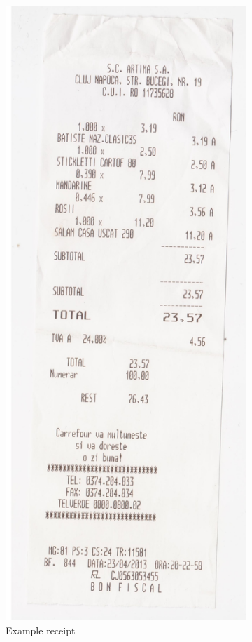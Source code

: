 \begin{figure}
\centering
\begin{subfigure}{0.45\linewidth}
  \centering
  \includegraphics[width=.6\linewidth]{img/bon1.jpg}
  \caption{Example receipt}
  \label{fig:sub1}
\end{subfigure}%
\begin{subfigure}{0.45\linewidth}
  \centering

\end{subfigure}
\end{figure}
